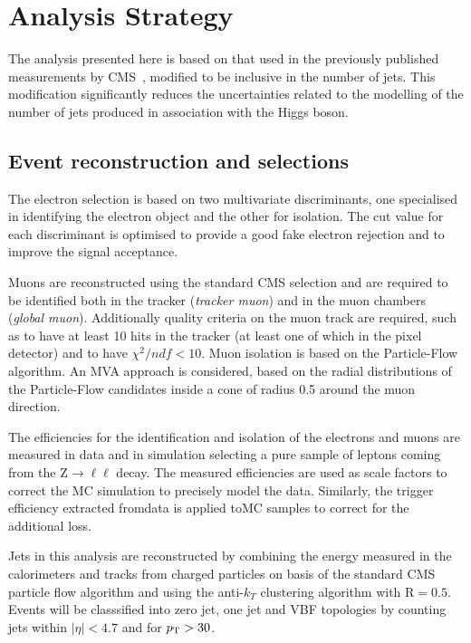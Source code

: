 \section{Analysis Strategy}
\label{sec:AnalysisStrategy}

The analysis presented here is based on that used in the previously published \hwwllvv{}
measurements by CMS~\cite{Chatrchyan:2013iaa}, modified to be inclusive in the number of jets. 
This modification significantly reduces the uncertainties related to the modelling of the number of jets produced in association with the Higgs boson.


\subsection{Event reconstruction and selections}\label{sec:Selections}

The electron selection is based on two multivariate discriminants, one specialised in identifying the electron object and the other for isolation. The cut value for each discriminant is optimised to provide a good fake electron rejection and to improve the signal acceptance.

Muons are reconstructed using the standard CMS selection and are required to be identified both in the tracker (\textit{tracker muon}) and in the muon chambers (\textit{global muon}). Additionally quality criteria on the muon track are required, such as to have at least 10 hits in the tracker (at least one of which in the pixel detector) and to have $\chi^2/ndf < 10$.
Muon isolation is based on the Particle-Flow algorithm. An MVA approach is considered, based on the radial distributions of the Particle-Flow candidates inside a cone of radius 0.5 around the muon direction.

The efficiencies for the identification and isolation of the electrons and muons are measured in data and in simulation selecting a pure sample of leptons coming from the Z$\to\ell\ell$ decay. The measured efficiencies are used as scale factors to correct the MC simulation to precisely model the data. Similarly, the trigger efficiency extracted fromdata is applied toMC samples to correct for the additional loss.

Jets in this analysis are reconstructed by combining the energy measured in the calorimeters and tracks from charged particles on basis of the standard CMS particle flow algorithm and using the anti-$k_T$ clustering algorithm with $\mathrm{R} = 0.5$. Events will be classsified into zero jet, one jet and VBF topologies by counting jets within $|\eta| < 4.7$ and for $p_\mathrm{T} > 30$\GeV.

